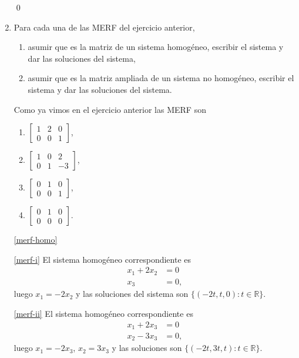 \begin{enumerate}[topsep=6pt, itemsep=.4cm]
\qed

\item Para cada una de las MERF del ejercicio anterior,
    \begin{enumerate}
        \item\label{merf-homo} asumir que es la matriz de un sistema homogéneo, escribir el sistema y dar las soluciones del sistema,
        \item\label{merf-ampliada} asumir que es la matriz ampliada de un sistema no homogéneo, escribir el sistema y dar las soluciones del sistema.
    \end{enumerate}

\rta Como ya vimos en el ejercicio anterior las MERF son
\begin{multicols}{4}
    \begin{enumerate}[label=\roman*)]
        \item\label{merf-i} $\begin{bmatrix}1 & 2 & 0 \\0 & 0 & 1 \end{bmatrix}$, \quad
        \item\label{merf-ii} $\begin{bmatrix}1 & 0 & 2 \\0 & 1 & -3 \end{bmatrix}$, \quad
        \item\label{merf-iii} $\begin{bmatrix}0 & 1 & 0 \\0 & 0 & 1 \end{bmatrix}$, \quad
        \item\label{merf-iv} $\begin{bmatrix}0 & 1 & 0 \\0 & 0 & 0 \end{bmatrix}$.
    \end{enumerate}
\end{multicols}

\ref{merf-homo}

\ref{merf-i} El sistema homogéneo correspondiente  es 
$$\begin{array}{rl}
x_1 +  2x_2 &= 0 \\ x_3&=0, 
\end{array}$$
luego $x_1= -2x_2$ y las soluciones del sistema son $\{ (-2t, t,0): t\in \mathbb R \}$.

\ref{merf-ii} El sistema homogéneo correspondiente  es 
$$\begin{array}{rl}
x_1+ 2x_3 &= 0 \\x_2  -3x_3 &= 0,
\end{array}$$
luego $x_1 = -2x_3$, $x_2 = 3x_3$ y las soluciones son $\{ (-2t, 3t,t): t\in \mathbb R \}$.



\end{enumerate}
